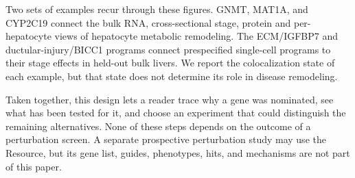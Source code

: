Two sets of examples recur through these figures. GNMT, MAT1A, and CYP2C19 connect the bulk RNA, cross-sectional stage, protein and per-hepatocyte views of hepatocyte metabolic remodeling. The ECM/IGFBP7 and ductular-injury/BICC1 programs connect prespecified single-cell programs to their stage effects in held-out bulk livers. We report the colocalization state of each example, but that state does not determine its role in disease remodeling.

Taken together, this design lets a reader trace why a gene was nominated, see what has been tested for it, and choose an experiment that could distinguish the remaining alternatives. None of these steps depends on the outcome of a perturbation screen. A separate prospective perturbation study may use the Resource, but its gene list, guides, phenotypes, hits, and mechanisms are not part of this paper.
